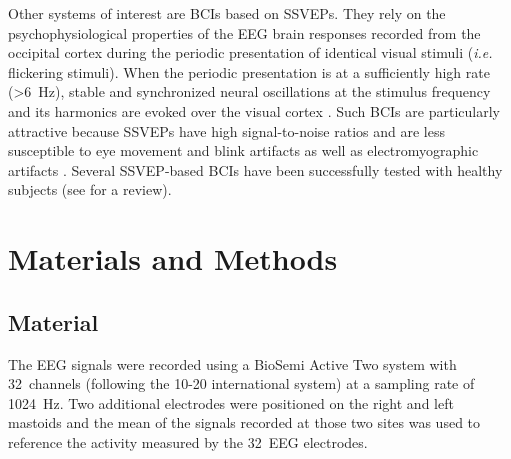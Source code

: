 \documentclass[10pt]{article}
\begin{document}

Other systems of interest are \acp{BCI} based on \acp{SSVEP}.
They rely on the psychophysiological properties of the EEG brain responses recorded from the occipital cortex during the periodic presentation of identical visual stimuli (\emph{i.e.} flickering stimuli).
When the periodic presentation is at a sufficiently high rate (\SI{>6}{\Hz}), stable and synchronized neural oscillations at the stimulus frequency and its harmonics are evoked over the visual cortex \parencite{Regan1966, Herrmann2001, Luck2005}.
Such \acp{BCI} are particularly attractive because \acp{SSVEP} have high signal-to-noise ratios and are less susceptible to eye movement and blink artifacts \parencite{Perlstein2003} as well as electromyographic artifacts \parencite{Gray2003}.
Several \ac{SSVEP}-based \acp{BCI} have been successfully tested with healthy subjects (see \cite{Vialatte2010} for a review).








\section{Materials and Methods}
\label{sec:2MatAndMet}

    \subsection{Material}
    \label{sec:2.1Material}

    The EEG signals were recorded using a BioSemi Active Two system with 32~channels (following the 10-20 international system) at a sampling rate of \SI{1024}{\Hz}.
    Two additional electrodes were positioned on the right and left mastoids and the mean of the signals recorded at those two sites was used to reference the activity measured by the 32~EEG electrodes.
\end{document}
